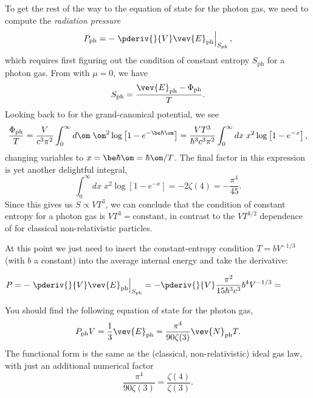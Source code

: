 To get the rest of the way to the equation of state for the photon gas, we need to compute the \textit{radiation pressure}
\begin{equation*}
  P_{\text{ph}} = -\left. \pderiv{}{V} \vev{E}_{\text{ph}} \right|_{S_{\text{ph}}},
\end{equation*}
which requires first figuring out the condition of constant entropy $S_{\text{ph}}$ for a photon gas.
From  with $\mu = 0$, we have
\begin{equation*}
  S_{\text{ph}} = \frac{\vev{E}_{\text{ph}} - \Phi_{\text{ph}}}{T}.
\end{equation*}
Looking back to  for the grand-canonical potential, we see
\begin{equation*}
  \frac{\Phi_{\text{ph}}}{T} = \frac{V}{c^3 \pi^2} \int_0^{\infty} d\om \; \om^2 \log\left[1 - e^{-\be \hbar \om}\right] = \frac{VT^3}{\hbar^3 c^3 \pi^2} \int_0^{\infty} dx \; x^2 \log\left[1 - e^{-x}\right],
\end{equation*}
changing variables to $x = \be \hbar \om = \hbar \om / T$.
The final factor in this expression is yet another delightful integral,
\begin{equation*}
  \int_0^{\infty} dx \; x^2 \log\left[1 - e^{-x}\right] = -2\zeta(4) = -\frac{\pi^4}{45}.
\end{equation*}
Since this gives us $S \propto VT^3$, we can conclude that the condition of constant entropy for a photon gas is $V T^3 = \mbox{constant}$, in contrast to the $V T^{3/2}$ dependence of  for classical non-relativistic particles.

\newpage %
At this point we just need to insert the constant-entropy condition $T = b V^{-1 / 3}$ (with $b$ a constant) into the average internal energy and take the derivative:
\begin{mdframed}
  $\displaystyle P = -\left. \pderiv{}{V} \vev{E}_{\text{ph}} \right|_{S_{\text{ph}}} = -\pderiv{}{V} \frac{\pi^2}{15 \hbar^3 c^3} b^4 V^{-1 / 3} = $ \\[100 pt]
\end{mdframed}
You should find the following equation of state for the photon gas,
\begin{equation}
  P_{\text{ph}} V = \frac{1}{3} \vev{E}_{\text{ph}} = \frac{\pi^4}{90\zeta(3)} \vev{N}_{\text{ph}} T.
\end{equation}
The functional form is the same as the (classical, non-relativistic) ideal gas law, with just an additional numerical factor
\begin{equation*}
  \frac{\pi^4}{90\zeta(3)} = \frac{\zeta(4)}{\zeta(3)}.
\end{equation*}



